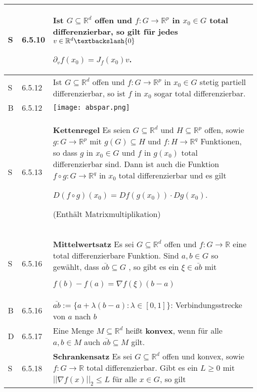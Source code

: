 \begin{longtable}{p{0.75cm} p{1cm} p{16cm}}
        \midrule
        S   & 6.5.10&   Ist $G \subseteq \mathbb{R}^d$ offen und $f: G\rightarrow \mathbb{R}^p$ in $x_0 \in G$ total differenzierbar, so gilt für jedes
                        $ v \in \mathbb{R}^d \textbackslash \{0\}$ \hfill \break
                        \centerline{$ \partial_vf(x_0) = J_f(x_0)v $.} \\
        \midrule
        S   & 6.5.12&   Ist $G \subseteq \mathbb{R}^d$ offen und $f: G\rightarrow \mathbb{R}^p$ in $x_0 \in G$ stetig partiell differenzierbar, so ist
                        $f$ in $x_0$ sogar total differenzierbar. \\
        \midrule
        B   & 6.5.12&   \texttt{[image: abspar.png]} \\
        \midrule
        S   & 6.5.13&   \textbf{Kettenregel} \hfill \break
                        Es seien $G \subseteq \mathbb{R}^d$ und $H \subseteq \mathbb{R}^p$ offen, sowie $g : G\rightarrow \mathbb{R}^p$ mit $g(G) \subseteq H$
                        und $f: H \rightarrow \mathbb{R}^q$ Funktionen, so dass $g$ in $x_0 \in G$ und $f$ in $g(x_0)$ total differenzierbar sind. Dann ist 
                        auch die Funktion $f \circ g : G \rightarrow \mathbb{R}^q$ in $x_0$ total differenzierbar und es gilt \hfill \break
                        \centerline{$ D(f\circ g)(x_0) = Df(g(x_0)) \cdot Dg(x_0) $.} 
                        (Enthält Matrixmultiplikation)\\
        \midrule
        S   & 6.5.16&   \textbf{Mittelwertsatz} \hfill \break
                        Es sei $G \subseteq \mathbb{R}^d$ offen und $f : G \rightarrow \mathbb{R}$ eine total differenzierbare Funktion. Sind 
                        $a,b \in G$ so gewählt, dass $\bar{ab} \subseteq G$ , so gibt es ein $\xi \in \bar{ab}$ mit \hfill \break
                        \centerline{$f(b) - f(a) = \nabla f(\xi)(b-a)$} \\
        \midrule
        B   & 6.5.16&   $\bar{ab} := \{a+\lambda(b-a):\lambda \in [0,1]\}$: Verbindungsstrecke von $a$ nach $b$ \\
        \midrule
        D   & 6.5.17&   Eine Menge $M \subseteq \mathbb{R}^d$ heißt \textbf{konvex}, wenn für alle $a,b \in M$ auch $\bar{ab} \subseteq M$ gilt. \\
        \midrule
        S   & 6.5.18&   \textbf{Schrankensatz} \hfill \break
                        Es sei $G \subseteq \mathbb{R}^d$ offen und konvex, sowie $f: G \rightarrow \mathbb{R}$ total differenzierbar. Gibt es ein
                        $L \geq 0$ mit $||\nabla f(x)||_2 \leq L$ für alle $x \in G$, so gilt \hfill \break

\end{longtable}
